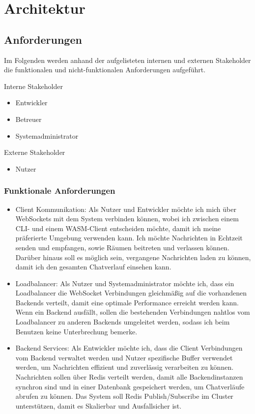 
\chapter{Architektur}

\section{Anforderungen}

Im Folgenden werden anhand der aufgelisteten internen und externen Stakeholder die funktionalen und nicht-funktionalen Anforderungen aufgeführt.

Interne Stakeholder

\begin{itemize}
  \item Entwickler
  \item Betreuer
  \item Systemadministrator
\end{itemize}


Externe Stakeholder
\begin{itemize}
  \item Nutzer
\end{itemize}

\subsection{Funktionale Anforderungen}
\begin{itemize}
  \item Client Kommunikation: 
    Als Nutzer und Entwickler möchte ich mich über WebSockets mit dem System verbinden können, wobei ich zwischen einem CLI- und einem WASM-Client entscheiden möchte, damit ich meine präferierte Umgebung verwenden kann. Ich möchte Nachrichten in Echtzeit senden und empfangen, sowie Räumen beitreten und verlassen können. Darüber hinaus soll es möglich sein, vergangene Nachrichten laden zu können, damit ich den gesamten Chatverlauf einsehen kann.
  \item Loadbalancer: Als Nutzer und Systemadministrator möchte ich, dass ein Loadbalancer die WebSocket Verbindungen gleichmäßig auf die vorhandenen Backends verteilt, damit eine optimale Performance erreicht werden kann. Wenn ein Backend ausfällt, sollen die bestehenden Verbindungen nahtlos vom Loadbalancer zu anderen Backends umgeleitet werden, sodass ich beim Benutzen keine Unterbrechung bemerke.
  \item Backend Services: Als Entwickler möchte ich, dass die Client Verbindungen vom Backend verwaltet werden und Nutzer spezifische Buffer verwendet werden, um Nachrichten effizient und zuverlässig verarbeiten zu können. Nachrichten sollen über Redis verteilt werden, damit alle Backendinstanzen synchron sind und in einer Datenbank gespeichert werden, um Chatverläufe abrufen zu können. Das System soll Redis Publish/Subscribe im Cluster unterstützen, damit es Skalierbar und Ausfallsicher ist.
\end{itemize}
